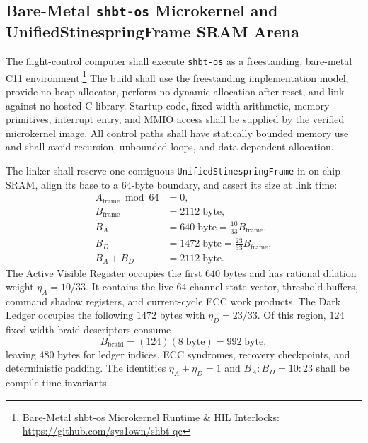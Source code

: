 \documentclass[10pt,twocolumn]{IEEEtran}
\newcommand{\shbtos}{\texttt{shbt-os}}
\begin{document}
\subsection{Bare-Metal \shbtos{} Microkernel and UnifiedStinespringFrame SRAM Arena}

The flight-control computer shall execute \shbtos{} as a freestanding, bare-metal C11 environment.\footnote{Bare-Metal shbt-os Microkernel Runtime \& HIL Interlocks: \url{https://github.com/sys1own/shbt-qc}}  The build shall use the freestanding implementation model, provide no heap allocator, perform no dynamic allocation after reset, and link against no hosted C library.  Startup code, fixed-width arithmetic, memory primitives, interrupt entry, and MMIO access shall be supplied by the verified microkernel image.  All control paths shall have statically bounded memory use and shall avoid recursion, unbounded loops, and data-dependent allocation.

The linker shall reserve one contiguous \texttt{UnifiedStinespringFrame} in on-chip SRAM, align its base to a $64$-byte boundary, and assert its size at link time:
\begin{equation}
\begin{aligned}
A_{\mathrm{frame}}\bmod64&=0, \\
B_{\mathrm{frame}}&=2112\;\mathrm{byte}, \\
B_A&=640\;\mathrm{byte}=\frac{10}{33}B_{\mathrm{frame}}, \\
B_D&=1472\;\mathrm{byte}=\frac{23}{33}B_{\mathrm{frame}}, \\
B_A+B_D&=2112\;\mathrm{byte}.
\end{aligned}
\label{eq:stinespring_frame_partition}
\end{equation}
The Active Visible Register occupies the first $640$ bytes and has rational dilation weight $\eta_A=10/33$.  It contains the live $64$-channel state vector, threshold buffers, command shadow registers, and current-cycle ECC work products.  The Dark Ledger occupies the following $1472$ bytes with $\eta_D=23/33$.  Of this region, $124$ fixed-width braid descriptors consume
\begin{equation}
B_{\mathrm{braid}}=(124)(8\;\mathrm{byte})=992\;\mathrm{byte},
\label{eq:braid_descriptor_allocation}
\end{equation}
leaving $480$ bytes for ledger indices, ECC syndromes, recovery checkpoints, and deterministic padding.  The identities $\eta_A+\eta_D=1$ and $B_A:B_D=10:23$ shall be compile-time invariants.
\end{document}
